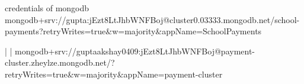 credentials of mongodb
mongodb+srv://gupta:jEzt8LtJhbWNFBoj@cluster0.03333.mongodb.net/school-payments?retryWrites=true&w=majority&appName=SchoolPayments

                             |               |
mongodb+srv://guptaakshay0409:jEzt8LtJhbWNFBoj@payment-cluster.zheylze.mongodb.net/?retryWrites=true&w=majority&appName=payment-cluster